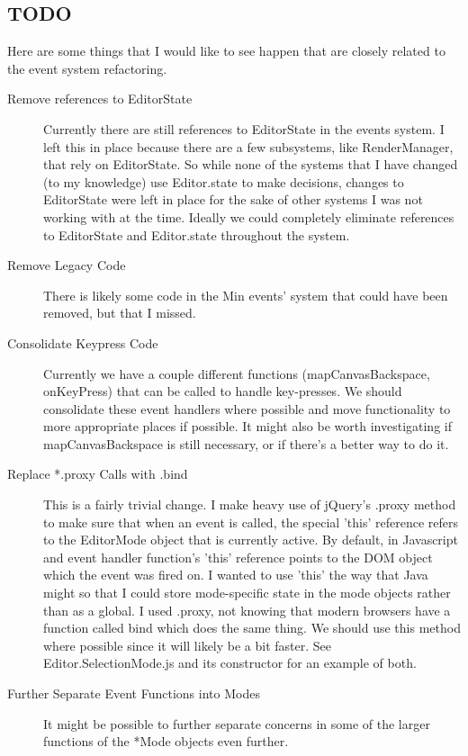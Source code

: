 \documentclass[letterpaper]{article}
\begin{document}
\newpage

\subsection*{TODO}
Here are some things that I would like to see happen that are closely related to
the event system refactoring.

\begin{description}
    \item[Remove references to EditorState] Currently there are still references
        to EditorState in the events system. I left this in place because there
        are a few subsystems, like RenderManager, that rely on EditorState. So
        while none of the systems that I have changed (to my knowledge) use
        Editor.state to make decisions, changes to EditorState were left in
        place for the sake of other systems I was not working with at the time.
        Ideally we could completely eliminate references to EditorState and
        Editor.state throughout the system.
    \item[Remove Legacy Code] There is likely some code in the Min events' system
        that could have been removed, but that I missed. 
    \item[Consolidate Keypress Code] Currently we have a couple different
        functions (mapCanvasBackspace, onKeyPress) that can be called to handle key-presses. We should
        consolidate these event handlers where possible and move functionality
        to more appropriate places if possible. It might also be worth
        investigating if mapCanvasBackspace is still necessary, or if there's a
        better way to do it.
    \item[Replace *.proxy Calls with .bind] This is a fairly trivial change. I
        make heavy use of jQuery's .proxy method to make sure that when an event
        is called, the special 'this' reference refers to the EditorMode object
        that is currently active. By default, in Javascript and event handler
        function's 'this' reference points to the DOM object which the event was
        fired on. I wanted to use 'this' the way that Java might so that I could
        store mode-specific state in the mode objects rather than as a global. I
        used .proxy, not knowing that modern browsers have a function called
        bind which does the same thing. We should use this method where possible
        since it will likely be a bit faster. See Editor.SelectionMode.js and
        its constructor for an example of both.
    \item[Further Separate Event Functions into Modes] It might be
        possible to further separate concerns in some of the larger functions of
        the *Mode objects even further. 
\end{description}
\end{document}
